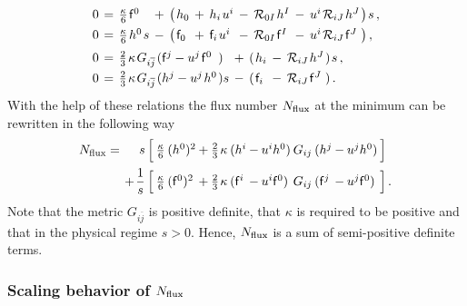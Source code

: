\documentclass[12pt,a4paper]{article}
\newcommand{\eq}[1]{\begin{equation}
                     \begin{split} #1 \end{split}
                     \end{equation}}
\newcommand{\ov}{\overline}
\newcommand{\op}{\hspace{1pt}}
\numberwithin{equation}{section}
\begin{document}
\eq{
  \label{eom_012}
  &
  \arraycolsep2pt
  \begin{array}{lclcc@{\hspace{1pt}}lclclcl@{\hspace{1pt}}l}
  0 &=& \frac{\kappa}{6} \op \mathsf f^0  &+& \bigl( &h_0 &+&  h_i \op u^i &- &\mathcal R_{0I} \op h^I  
  &-& u^i\op \mathcal R_{iJ} \op h^J &\bigr) \op s\,, 
  \\[4pt]
   0 &=& \frac{\kappa}{6} \op h^0 \op s &-& \bigl( &\mathsf f_0 &+&\mathsf f_i \op u^i &-&\mathcal R_{0I}\op  \mathsf f^I 
  &-& u^i \op\mathcal R_{iJ} \op \mathsf f^J& \bigr) \,, 
  \end{array}
  \\[2pt]
  &
  \arraycolsep2pt
  \begin{array}{lcl@{\hspace{1pt}}l@{\hspace{1pt}}lclcl@{\hspace{1pt}}l}
  0&=& \frac{2}{3}\op\kappa\op G_{i\ov j} & ( \mathsf f^j - u^j\op \mathsf f^0 &) &+& (\op h_i &-& \mathcal R_{iJ} \op h^J &) \op s\,,
   \\[4pt]
  0 &=& \frac{2}{3}\op\kappa \op G_{i\ov j} & (h^j - u^j\op h^0 &) s &-& (\op \mathsf f_i  &-& \mathcal R_{iJ} \op \mathsf f^J&) \,.
  \end{array}
}
With the help of these relations the flux number $N_{\rm flux}$ at the minimum
can be rewritten in the following way
\eq{
\label{tad_04}
 N_{\rm flux} =
 \arraycolsep1pt
 \begin{array}[t]{rlllllllllllll}
   \displaystyle s &\Bigl[ & \frac{\kappa}{6} & (h^0)^2 &+& \frac{2}{3}\op\kappa& (h^i  &-& u^i h^0) & G_{ij} & (h^j  &-& u^j h^0) &\Bigr]
  \\[8pt]
  + \op\displaystyle \frac{1}{s} &\Bigl[ & \frac{\kappa}{6} & (\mathsf f^0)^2 &+& \frac{2}{3}\op\kappa& (\mathsf f^i  &-& u^i \mathsf f^0) 
  & G_{ij} & (\mathsf f^j  &-& u^j \mathsf f^0) &\Bigr]\,.
  \end{array}
}
Note that the metric $G_{i\ov j}$ is positive definite, that
$\kappa$ is required to be positive  and that in the physical regime $s>0$.
Hence, $N_{\rm flux}$ is a sum of semi-positive definite terms. 



\subsubsection*{Scaling behavior of $N_{\rm flux}$}
\end{document}

